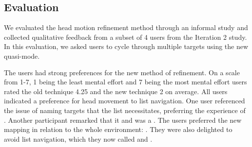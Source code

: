 \subsection{Evaluation}
We evaluated the head motion refinement method through an informal study and
collected qualitative feedback from a subset of 4 users from the Iteration 2
study. In this evaluation, we asked users to cycle through multiple targets using
the new quasi-mode.

The users had strong preferences for the new method of refinement.
On a scale from 1-7, 1 being the least mental effort and
7 being the most mental effort users rated the old technique 4.25 and
the new technique 2 on average. All users indicated a preference for head
movement to list navigation. One user referenced the issue of naming
targets that the list necessitates, preferring the experience of
.  Another
participant remarked that it  and was
a . The
users preferred the new mapping in relation to the whole environment:
. They were also delighted to avoid list navigation,
which they now called  and .
